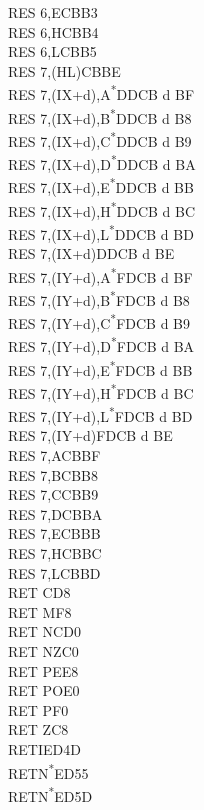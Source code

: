 \documentclass[twoside,openright,a4paper]{book}
\begin{document}
\begin{multicols}{3}
{\begin{tabbing}
	RES 6,E\>CBB3\\
	RES 6,H\>CBB4\\
	RES 6,L\>CBB5\\
	RES 7,(HL)\>CBBE\\
	RES 7,(IX+d),A\textsuperscript{*}\>DDCB d BF\\
	RES 7,(IX+d),B\textsuperscript{*}\>DDCB d B8\\
	RES 7,(IX+d),C\textsuperscript{*}\>DDCB d B9\\
	RES 7,(IX+d),D\textsuperscript{*}\>DDCB d BA\\
	RES 7,(IX+d),E\textsuperscript{*}\>DDCB d BB\\
	RES 7,(IX+d),H\textsuperscript{*}\>DDCB d BC\\
	RES 7,(IX+d),L\textsuperscript{*}\>DDCB d BD\\
	RES 7,(IX+d)\>DDCB d BE\\
	RES 7,(IY+d),A\textsuperscript{*}\>FDCB d BF\\
	RES 7,(IY+d),B\textsuperscript{*}\>FDCB d B8\\
	RES 7,(IY+d),C\textsuperscript{*}\>FDCB d B9\\
	RES 7,(IY+d),D\textsuperscript{*}\>FDCB d BA\\
	RES 7,(IY+d),E\textsuperscript{*}\>FDCB d BB\\
	RES 7,(IY+d),H\textsuperscript{*}\>FDCB d BC\\
	RES 7,(IY+d),L\textsuperscript{*}\>FDCB d BD\\
	RES 7,(IY+d)\>FDCB d BE\\
	RES 7,A\>CBBF\\
	RES 7,B\>CBB8\\
	RES 7,C\>CBB9\\
	RES 7,D\>CBBA\\
	RES 7,E\>CBBB\\
	RES 7,H\>CBBC\\
	RES 7,L\>CBBD\\
	RET C\>D8\\
	RET M\>F8\\
	RET NC\>D0\\
	RET NZ\>C0\\
	RET PE\>E8\\
	RET PO\>E0\\
	RET P\>F0\\
	RET Z\>C8\\
	RETI\>ED4D\\
	RETN\textsuperscript{*}\>ED55\\
	RETN\textsuperscript{*}\>ED5D\\

\end{tabbing}}
\end{multicols}
\end{document}
